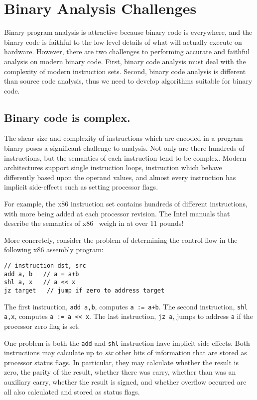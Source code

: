 \section{Binary Analysis Challenges}
\label{sec:goals}

Binary program analysis is attractive because binary code is
everywhere, and the binary code is faithful to the low-level details
of what will actually execute on hardware.  However, there are two
challenges to performing accurate and faithful analysis on modern
binary code. First, binary code analysis must deal with the complexity
of modern instruction sets. Second, binary code analysis is different
than source code analysis, thus we need to develop algorithms suitable
for binary code.

\subsection{Binary code is complex.} The shear size and complexity of
instructions which are encoded in a program binary poses a significant
challenge to analysis.  Not only are there hundreds of instructions,
but the semantics of each instruction tend to be complex.  Modern
architectures support single instruction loops, instruction which
behave differently based upon the operand values, and almost every
instruction has implicit side-effects such as setting processor flags.

For example, the x86 instruction set contains hundreds of different
instructions, with more being added at each processor revision.  The
Intel manuals that describe the semantics of x86~\cite{intel:x86}
weigh in at over 11 pounds!

More concretely, consider the problem of determining the control flow
in the following x86 assembly program:
\begin{small}
\begin{lstlisting}
// instruction dst, src
add a, b   // a = a+b
shl a, x   // a << x
jz target   // jump if zero to address target
\end{lstlisting}
\end{small}


The first instruction, {\tt add a,b}, computes {\tt a := a+b}. The
second instruction, {\tt shl a,x}, computes {\tt a := a << x}.  The
last instruction, {\tt jz a}, jumps to address {\tt a} if the
processor zero flag is set.

One problem is both the {\tt add} and {\tt shl} instruction have
implicit side effects. Both instructions may calculate up to
\emph{six} other bits of information that are stored as processor
status flags.  In particular, they may calculate whether the result is
zero, the parity of the result, whether there was carry, whether than
was an auxiliary carry, whether the result is signed, and whether
overflow occurred are all also calculated and stored as status flags.

